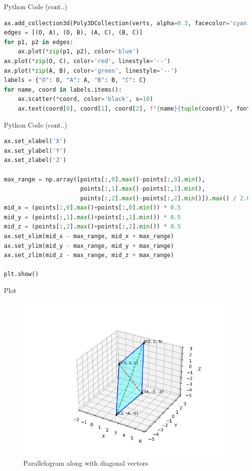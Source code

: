 \documentclass{beamer}
\begin{document}
\begin{frame}[fragile]{Python Code (cont..)}
\begin{lstlisting}[language=Python]
ax.add_collection3d(Poly3DCollection(verts, alpha=0.3, facecolor='cyan'))
edges = [(O, A), (O, B), (A, C), (B, C)]
for p1, p2 in edges:
    ax.plot(*zip(p1, p2), color='blue')
ax.plot(*zip(O, C), color='red', linestyle='--')
ax.plot(*zip(A, B), color='green', linestyle='--')
labels = {"O": O, "A": A, "B": B, "C": C}
for name, coord in labels.items():
    ax.scatter(*coord, color='black', s=10)
    ax.text(coord[0], coord[1], coord[2], f"{name}{tuple(coord)}", fontsize=9)

\end{lstlisting}
\end{frame}

\begin{frame}[fragile]{Python Code (cont..)}
\begin{lstlisting}[language=Python]
ax.set_xlabel('X')
ax.set_ylabel('Y')
ax.set_zlabel('Z')

max_range = np.array([points[:,0].max()-points[:,0].min(), 
                      points[:,1].max()-points[:,1].min(), 
                      points[:,2].max()-points[:,2].min()]).max() / 2.0
mid_x = (points[:,0].max()+points[:,0].min()) * 0.5
mid_y = (points[:,1].max()+points[:,1].min()) * 0.5
mid_z = (points[:,2].max()+points[:,2].min()) * 0.5
ax.set_xlim(mid_x - max_range, mid_x + max_range)
ax.set_ylim(mid_y - max_range, mid_y + max_range)
ax.set_zlim(mid_z - max_range, mid_z + max_range)

plt.show()

\end{lstlisting}
\end{frame}

\begin{frame}[fragile]{Plot}
\begin{figure}[H]\centering
\includegraphics[width=1\columnwidth]{figs/plt.png}
\caption{Parallelogram along with diagonal vectors}
\label{fig:plt}
\end{figure}
\end{frame}
\end{document}
